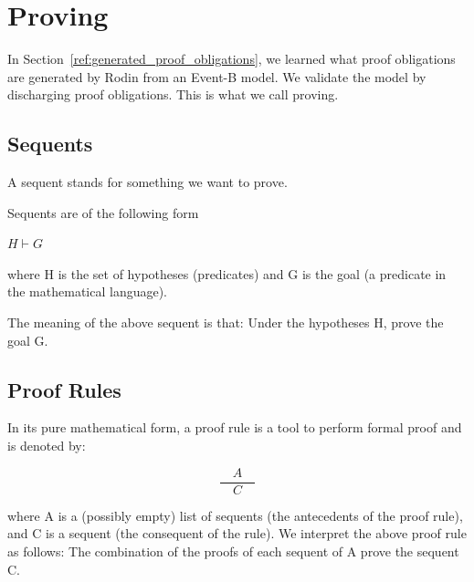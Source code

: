 \section{Proving}
\label{reference_04}

In Section~\ref{ref:generated_proof_obligations}, we learned what proof obligations are generated by Rodin from an Event-B model.  We validate the model by discharging proof obligations.  This is what we call proving.


\subsection{Sequents}
\label{sequents}

A sequent stands for something we want to prove.

Sequents are of the following form

$H \vdash G$

where H is the set of hypotheses (predicates) and G is the goal (a predicate in the mathematical language).

The meaning of the above sequent is that: Under the hypotheses H, prove the goal G. 

\subsection{Proof Rules}

In its pure mathematical form, a proof rule is a tool to perform formal proof and is denoted by: 

$$\frac{\quad A\quad}{C}$$

where A is a (possibly empty) list of sequents (the antecedents of the proof rule), and C is a sequent (the consequent of the rule). We interpret the above proof rule as follows: The combination of the proofs of each sequent of A prove the sequent C. 

